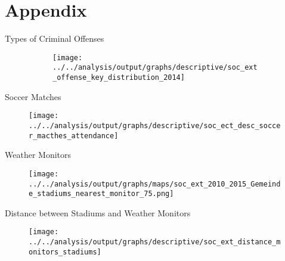 \documentclass[usenames,dvipsnames]{beamer} %
\begin{document}
\section*{Appendix}



\label{CRIMINAL_OFFENSE_CODES}
	\begin{frame}{Types of Criminal Offenses}
	\hyperlink{CRIME_DATA}{}
		\begin{figure}
			\begin{figure}
				\texttt{[image: ../../analysis/output/graphs/descriptive/soc\_ext\_offense\_key\_distribution\_2014]}
			\end{figure}
		\end{figure}
	\end{frame}

	\begin{frame}{Soccer Matches}\label{link_soccer_matches}
		\begin{figure}
			\texttt{[image: ../../analysis/output/graphs/descriptive/soc\_ect\_desc\_soccer\_macthes\_attendance]}
		\end{figure}
		\hyperlink{link_soccer_data}{}
	\end{frame}

	\begin{frame}{Weather Monitors}\label{link_map_stadiums}
		\hyperlink{link_weather_data}{}
		\begin{figure}
			\texttt{[image: ../../analysis/output/graphs/maps/soc\_ext\_2010\_2015\_Gemeinde\_stadiums\_nearest\_monitor\_75.png]}
		\end{figure}
	\end{frame}

	\begin{frame}{Distance between Stadiums and Weather Monitors}\label{link_hist_dist_monitor_stadiums}
		\hyperlink{link_weather_data}{}
		\begin{figure}
			\texttt{[image: ../../analysis/output/graphs/descriptive/soc\_ext\_distance\_monitors\_stadiums]}
		\end{figure}
	\end{frame}
\end{document}
